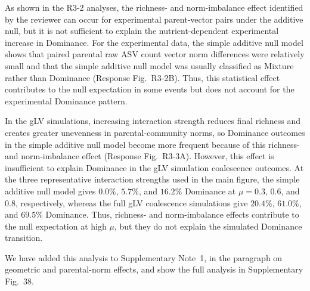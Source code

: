 
\responselabel
As shown in the R3-2 analyses, the richness- and norm-imbalance effect identified by the reviewer can occur for experimental parent-vector pairs under the additive null, but it is not sufficient to explain the nutrient-dependent experimental increase in Dominance. For the experimental data, the simple additive null model shows that paired parental raw ASV count vector norm differences were relatively small and that the simple additive null model was usually classified as Mixture rather than Dominance (Response Fig.~R3-2B). Thus, this statistical effect contributes to the null expectation in some events but does not account for the experimental Dominance pattern.

In the gLV simulations, increasing interaction strength reduces final richness and creates greater unevenness in parental-community norms, so Dominance outcomes in the simple additive null model become more frequent because of this richness- and norm-imbalance effect (Response Fig.~R3-3A). However, this effect is insufficient to explain Dominance in the gLV simulation coalescence outcomes. At the three representative interaction strengths used in the main figure, the simple additive null model gives $0.0\%$, $5.7\%$, and $16.2\%$ Dominance at $\mu = 0.3$, $0.6$, and $0.8$, respectively, whereas the full gLV coalescence simulations give $20.4\%$, $61.0\%$, and $69.5\%$ Dominance. Thus, richness- and norm-imbalance effects contribute to the null expectation at high $\mu$, but they do not explain the simulated Dominance transition.

We have added this analysis to Supplementary Note~1, in the paragraph on geometric and parental-norm effects, and show the full analysis in Supplementary Fig.~38.

